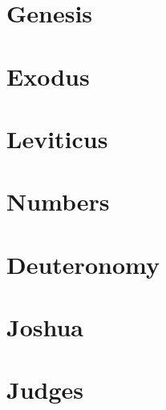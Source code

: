 \chapter{Genesis}
\begin{multicols}{2}
  \raggedcolumns
  \parskip=0pt \relax
  
\end{multicols}

\chapter{Exodus}
\begin{multicols}{2}
  \raggedcolumns
  \parskip=0pt \relax
  
\end{multicols}

\chapter{Leviticus}
\begin{multicols}{2}
  \raggedcolumns
  \parskip=0pt \relax
  
\end{multicols}

\chapter{Numbers}
\begin{multicols}{2}
  \raggedcolumns
  \parskip=0pt \relax
  
\end{multicols}

\chapter{Deuteronomy}
\begin{multicols}{2}
  \raggedcolumns
  \parskip=0pt \relax
  
\end{multicols}

\chapter{Joshua}
\begin{multicols}{2}
  \raggedcolumns
  \parskip=0pt \relax
  
\end{multicols}

\chapter{Judges}
\begin{multicols}{2}
  \raggedcolumns
  \parskip=0pt \relax
  
\end{multicols}

